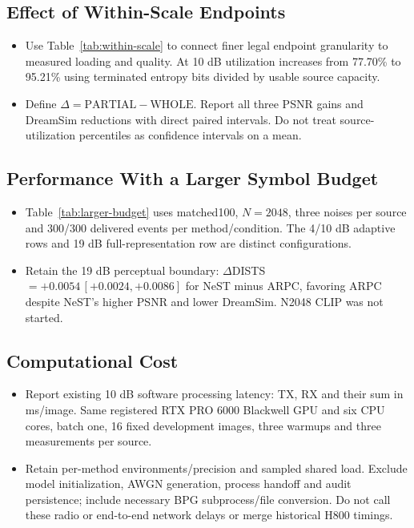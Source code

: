 \documentclass[10pt]{article}
\begin{document}
\subsection{Effect of Within-Scale Endpoints}
\begin{itemize}
\item Use Table~\ref{tab:within-scale} to connect finer legal endpoint granularity to measured loading and quality. At 10 dB utilization increases from 77.70\% to 95.21\% using terminated entropy bits divided by usable source capacity.
\item Define $\Delta=\mathrm{PARTIAL}-\mathrm{WHOLE}$. Report all three PSNR gains and DreamSim reductions with direct paired intervals. Do not treat source-utilization percentiles as confidence intervals on a mean.
\end{itemize}

\subsection{Performance With a Larger Symbol Budget}
\begin{itemize}
\item Table~\ref{tab:larger-budget} uses matched100, $N=2048$, three noises per source and 300/300 delivered events per method/condition. The 4/10 dB adaptive rows and 19 dB full-representation row are distinct configurations.
\item Retain the 19 dB perceptual boundary: $\Delta$DISTS $=+0.0054\,[+0.0024,+0.0086]$ for NeST minus ARPC, favoring ARPC despite NeST's higher PSNR and lower DreamSim. N2048 CLIP was not started.
\end{itemize}

\subsection{Computational Cost}

\begin{itemize}
\item Report existing 10 dB software processing latency: TX, RX and their sum in ms/image. Same registered RTX PRO 6000 Blackwell GPU and six CPU cores, batch one, 16 fixed development images, three warmups and three measurements per source.
\item Retain per-method environments/precision and sampled shared load. Exclude model initialization, AWGN generation, process handoff and audit persistence; include necessary BPG subprocess/file conversion. Do not call these radio or end-to-end network delays or merge historical H800 timings.
\end{itemize}
\end{document}
